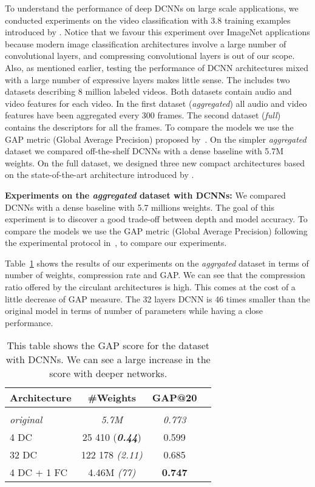 To understand the performance of deep DCNNs on large scale applications, we conducted experiments on the \yt video classification with 3.8 training examples introduced by \cite{abu2016youtube}. Notice that we favour this experiment over ImageNet applications because modern image classification architectures involve a large number of convolutional layers, and compressing convolutional layers is out of our scope. 
Also, as mentioned earlier, testing the performance of DCNN architectures mixed with a large number of expressive layers makes little sense. The \yt includes two datasets describing 8 million labeled videos. Both datasets contain audio and video features for each video. In the first dataset ({\em aggregated}) all audio and video features have been aggregated every 300 frames. The second dataset ({\em full}) contains the descriptors for all the frames. To compare the models we use the GAP metric (Global Average Precision) proposed by~\cite{abu2016youtube}. On the simpler {\em aggregated} dataset we compared off-the-shelf DCNNs with a dense baseline with 5.7M weights.  On the full dataset, we designed three new compact architectures based on the state-of-the-art architecture introduced by \cite{abu2016youtube}. 

\textbf{Experiments on the {\em aggregated} dataset with DCNNs:}
We compared DCNNs with a dense baseline with 5.7 millions weights. The goal of this experiment is to discover a good trade-off between depth and model accuracy. To compare the models we use the GAP metric (Global Average Precision) following the experimental protocol in~\cite{abu2016youtube}, to compare our experiments. 

Table~\ref{table:youtube_agg_xp} shows the results of our experiments on the {\em aggrgated} \yt dataset in terms of number of weights, compression rate and GAP.
We can see that the compression ratio offered by the circulant  architectures is high. This comes at the cost of a little decrease of GAP measure. The 32 layers DCNN is 46 times smaller than the original model in terms of number of parameters while having a close performance. 




\begin{table}
  \centering
  \caption{This table shows the GAP score for the \yt dataset with DCNNs. We can see a large increase in the score with deeper networks.}
  \begin{tabular}{lccc}
    \toprule
    \textbf{Architecture} & \textbf{\#Weights} &
    \textbf{GAP@20} \\
    \hline \\
    \textit{original} & \textit{5.7M} & \textit{0.773} \\
    4 DC & 25 410  (\textit{\textbf{0.44}}) & 0.599   \\
    32 DC  & 122 178 \textit{(2.11)} & 0.685   \\
    4 DC + 1 FC & 4.46M \textit{(77)} & \textbf{0.747} \\
  \hline
  \end{tabular}
  \label{table:youtube_agg_xp}
\end{table}


